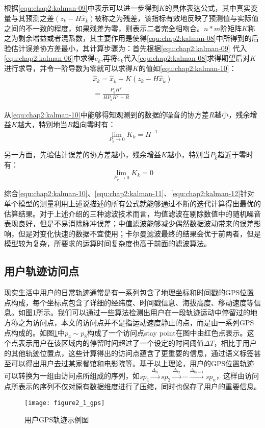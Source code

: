 \par 根据\ref{equ:chap2:kalman-09}中表示可以进一步得到$K$的具体表达公式，其中真实变量与其预测之差$(z_{k}-H\hat{x}_{\bar{k}})$被称之为残差，该指标有效地反映了预测值与实际值之间的不一致的程度，如果残差为零，则表示二者完全相吻合。$n*m$阶矩阵$K$称之为剩余增益或者混系数，其主要作用是使得\ref{equ:chap2:kalman-08}中所得到的后验估计误差协方差最小，其计算步骤为：首先根据\ref{equ:chap2:kalman-09} 代入\ref{equ:chap2:kalman-06}中求得$e_{k}$,再将$e_{k}$代入\ref{equ:chap2:kalman-08}求得期望后对$K$进行求导，并令一阶导数为零就可以求得$K$的值如\ref{equ:chap2:kalman-10}：
\begin{align}
\label{equ:chap2:kalman-10}
\hat{x}_{k}=\hat{x}_{\bar{k}} + K(z_{k}-H\hat{x}_{\bar{k}})
\nonumber \\
=\frac{P_{\bar{k}}H^{T}}{HP_{\bar{k}}H^{T}+R}
\end{align}
\par 从\ref{equ:chap2:kalman-10}中能够得知观测到的数据的噪音的协方差$R$越小，残余增益$K$越大，特别地当$R$趋向零时有：
\begin{equation}
\label{equ:chap2:kalman-11}
\lim_{P_{k} \to 0 }K_{k}=H^{-1}
\end{equation}
\par 另一方面，先验估计误差的协方差越小，残余增益$K$越小，特别当$P_{\bar{k}}$趋近于零时有：
\begin{equation}
\label{equ:chap2:kalman-12}
\lim_{P_{\bar{k}} \to 0 }K_{k}=0
\end{equation}
\par 综合\ref{equ:chap2:kalman-10}、\ref{equ:chap2:kalman-11}、\ref{equ:chap2:kalman-12}针对单个模型的测量利用上述说描述的所有公式就能够通过不断的迭代计算得出最优的估算结果。对于上述介绍的三种滤波技术而言，均值滤波在剔除数值中的随机噪音表现良好，但是不易消除脉冲误差；中值滤波能够减少偶然数据波动带来的误差影响，但是对变化快速的数据不宜使用；卡尔曼滤波最终的结果会优于前两者，但是模型较为复杂，所要求的运算时间复杂度也高于前面的滤波算法。
\subsection{用户轨迹访问点}
现实生活中用户的日常轨迹通常是有一系列包含了地理坐标和时间戳的GPS位置点构成，每个坐标点包含了详细的经纬度、时间戳信息、海拔高度、移动速度等信息。如图\ref{fig:2_1}所示。我们可以通过一些算法检测出用户在一段轨迹运动中停留过的地方称之为访问点，本文的访问点并不是指运动速度静止的点，而是由一系列GPS点构成的。如图\ref{fig:2_1}中$p_{4} \sim p_{8}$构成了一个访问点stay point在图中由红色点表示。这个点表示用户在该区域内的停留时间超过了一个设定的时间阈值$\Delta T$，相比于用户的其他轨迹位置点，这些计算得出的访问点蕴含了更重要的信息，通过语义标签甚至可以得出用户去过某家餐馆和电影院等。基于以上理论，用户的GPS位置轨迹可以转换为一组由访问点所组成的序列，如$sp_{1}\overset{\Delta_{t1}}{\rightarrow} sp_{2}\overset{\Delta_{t2}}{\rightarrow}\cdots \overset{\Delta_{tn-1}}{\rightarrow}sp_{n}$，这样由访问点所表示的序列不仅对原有数据维度进行了压缩，同时也保存了用户的重要信息。
\begin{figure}[H]
\centering
\texttt{[image: figure2\_1\_gps]}
\caption{用户GPS轨迹示例图}
\label{fig:2_1}
\end{figure}
